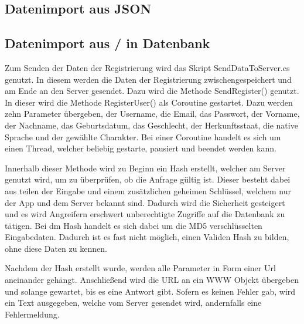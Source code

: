 \subsection{Datenimport aus JSON}
\subsection{Datenimport aus / in Datenbank}

Zum Senden der Daten der Registrierung wird das Skript SendDataToServer.cs genutzt. In diesem werden die Daten der Registrierung zwischengespeichert und am Ende an den Server gesendet. Dazu wird die Methode SendRegister() genutzt. In dieser wird die Methode RegisterUser() als Coroutine gestartet. Dazu werden zehn Parameter übergeben, der Username, die Email, das Passwort, der Vorname, der Nachname, das Geburtsdatum, das Geschlecht, der Herkunftsstaat, die native Sprache und der gewählte Charakter. Bei einer Coroutine handelt es sich um einen Thread, welcher beliebig gestarte, pausiert und beendet werden kann.

Innerhalb dieser Methode wird zu Beginn ein Hash erstellt, welcher am Server genutzt wird, um zu überprüfen, ob die Anfrage gültig ist. Dieser besteht dabei aus teilen der Eingabe und einem zusätzlichen geheimen Schlüssel, welchem nur der App und dem Server bekannt sind. Dadurch wird die Sicherheit gesteigert und es wird Angreifern erschwert unberechtigte Zugriffe auf die Datenbank zu tätigen. Bei dm Hash handelt es sich dabei um die MD5 verschlüsselten Eingabedaten. Dadurch ist es fast nicht möglich, einen Validen Hash zu bilden, ohne diese Daten zu kennen.

Nachdem der Hash erstellt wurde, werden alle Parameter in Form einer Url aneinander gehängt. Anschließend wird die URL an ein WWW Objekt übergeben und solange gewartet, bis es eine Antwort gibt. Sofern es keinen Fehler gab, wird ein Text ausgegeben, welche vom Server gesendet wird, andernfalls eine Fehlermeldung.


